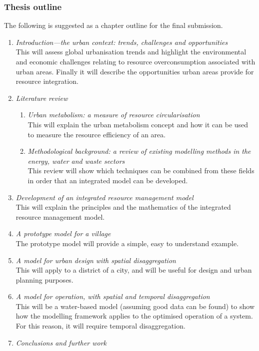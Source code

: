 \subsubsection*{Thesis outline}
The following is suggested as a chapter outline for the final submission.
\begin{enumerate}
	\item \emph{Introduction---the urban context: trends, challenges and opportunities} \\
		This will assess global urbanisation trends and highlight the environmental and economic challenges relating to resource overconsumption associated with urban areas. Finally it will describe the opportunities urban areas provide for resource integration.
	\item \emph{Literature review} \\
		\begin{enumerate}
			\item \emph{Urban metabolism: a measure of resource circularisation} \\
				This will explain the urban metabolism concept and how it can be used to measure the resource efficiency of an area.
			\item \emph{Methodological background: a review of existing modelling methods in the energy, water and waste sectors} \\
				This review will show which techniques can be combined from these fields in order that an integrated model can be developed.
		\end{enumerate}
	\item \emph{Development of an integrated resource management model} \\
		This will explain the principles and the mathematics of the integrated resource management model.
	
	\item \emph{A prototype model for a village} \\
		The prototype model will provide a simple, easy to understand example.
	\item \emph{A model for urban design with spatial disaggregation} \\
		This will apply to a district of a city, and will be useful for design and urban planning purposes.
	\item \emph{A model for operation, with spatial and temporal disaggregation} \\
		This will be a water-based model (assuming good data can be found) to show how the modelling framework applies to the optimised operation of a system. For this reason, it will require temporal disaggregation.
	\item \emph{Conclusions and further work}
\end{enumerate}

